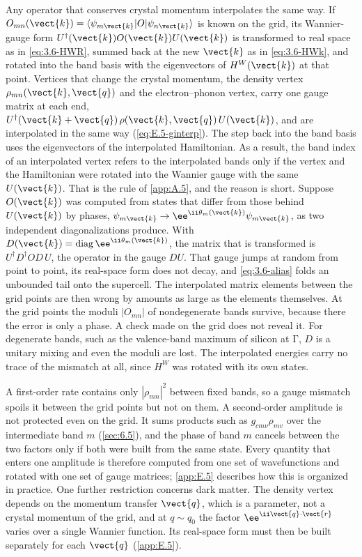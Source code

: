 Any operator that conserves crystal momentum interpolates the same way. If $O_{mn}(\vect{k}) = \langle\psi_{m\vect{k}}|O|\psi_{n\vect{k}}\rangle$ is known on the grid, its Wannier-gauge form $U^\dagger(\vect{k})O(\vect{k})U(\vect{k})$ is transformed to real space as in \cref{eq:3.6-HWR}, summed back at the new $\vect{k}$ as in \cref{eq:3.6-HWk}, and rotated into the band basis with the eigenvectors of $H^W(\vect{k})$ at that point. Vertices that change the crystal momentum, the density vertex $\rho_{mn}(\vect{k},\vect{q})$ and the electron--phonon vertex, carry one gauge matrix at each end, $U^\dagger(\vect{k} + \vect{q})\,\rho(\vect{k},\vect{q})\,U(\vect{k})$, and are interpolated in the same way (\cref{eq:E.5-ginterp}). The step back into the band basis uses the eigenvectors of the interpolated Hamiltonian. As a result, the band index of an interpolated vertex refers to the interpolated bands only if the vertex and the Hamiltonian were rotated into the Wannier gauge with the same $U(\vect{k})$. That is the rule of \cref{app:A.5}, and the reason is short. Suppose $O(\vect{k})$ was computed from states that differ from those behind $U(\vect{k})$ by phases, $\psi_{m\vect{k}} \to \ee^{\ii\theta_m(\vect{k})}\psi_{m\vect{k}}$, as two independent diagonalizations produce. With $D(\vect{k}) = \mathrm{diag}\,\ee^{\ii\theta_m(\vect{k})}$, the matrix that is transformed is $U^\dagger D^\dagger OD\,U$, the operator in the gauge $DU$. That gauge jumps at random from point to point, its real-space form does not decay, and \cref{eq:3.6-alias} folds an unbounded tail onto the supercell. The interpolated matrix elements between the grid points are then wrong by amounts as large as the elements themselves. At the grid points the moduli $|O_{mn}|$ of nondegenerate bands survive, because there the error is only a phase. A check made on the grid does not reveal it. For degenerate bands, such as the valence-band maximum of silicon at $\mathrm{\Gamma}$, $D$ is a unitary mixing and even the moduli are lost. The interpolated energies carry no trace of the mismatch at all, since $H^W$ was rotated with its own states.

A first-order rate contains only $|\rho_{mn}|^2$ between fixed bands, so a gauge mismatch spoils it between the grid points but not on them. A second-order amplitude is not protected even on the grid. It sums products such as $g_{cm\nu}\rho_{mv}$ over the intermediate band $m$ (\cref{sec:6.5}), and the phase of band $m$ cancels between the two factors only if both were built from the same state. Every quantity that enters one amplitude is therefore computed from one set of wavefunctions and rotated with one set of gauge matrices; \cref{app:E.5} describes how this is organized in practice. One further restriction concerns dark matter. The density vertex depends on the momentum transfer $\vect{q}$, which is a parameter, not a crystal momentum of the grid, and at $q \sim q_0$ the factor $\ee^{\ii\vect{q}\cdot\vect{r}}$ varies over a single Wannier function. Its real-space form must then be built separately for each $\vect{q}$ (\cref{app:E.5}).

